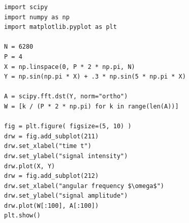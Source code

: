 
\begin{frame}[fragile]
%
\begin{codebox}[Example: Discrete Sine Transform, width=.63\linewidth, nobeforeafter, equal height group=grpDST]
\begin{verbatim}
import scipy
import numpy as np
import matplotlib.pyplot as plt

N = 6280
P = 4
X = np.linspace(0, P * 2 * np.pi, N)
Y = np.sin(np.pi * X) + .3 * np.sin(5 * np.pi * X)

A = scipy.fft.dst(Y, norm="ortho")
W = [k / (P * 2 * np.pi) for k in range(len(A))]

fig = plt.figure( figsize=(5, 10) )
drw = fig.add_subplot(211)
drw.set_xlabel("time t")
drw.set_ylabel("signal intensity")
drw.plot(X, Y)
drw = fig.add_subplot(212)
drw.set_xlabel("angular frequency $\omega$")
drw.set_ylabel("signal amplitude")
drw.plot(W[:100], A[:100])
plt.show()
\end{verbatim}
\end{codebox}
%
\begin{tcolorbox}[title=Output, width=.36\linewidth, nobeforeafter, equal height group=grpDST]

\end{tcolorbox}
\end{frame}
